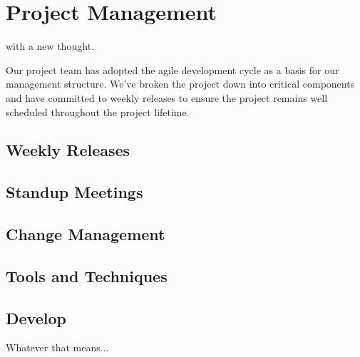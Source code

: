 \chapter[Project Management]{Project Management}
\label{ch:management}


 with a new thought.

Our project team has adopted the agile development cycle as a basis for our management structure. We've broken the project down into critical components and have committed to weekly releases to ensure the project remains well scheduled throughout the project lifetime.




\section{Weekly Releases}

\section{Standup Meetings}

\section{Change Management}

\section{Tools and Techniques}

\section{Develop}

Whatever that means...